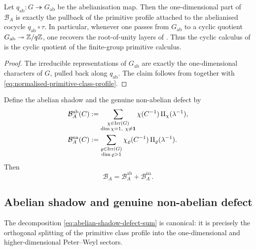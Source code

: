\begin{corollary}
  \label{cor:abelian-cyclic-shadow}
  Let \(q_{\mathrm{ab}}:G\twoheadrightarrow G_{\mathrm{ab}}\) be the
  abelianisation map. Then the one-dimensional part of
  \(\mathcal B_A\) is exactly the pullback of the primitive profile
  attached to the abelianised cocycle \(q_{\mathrm{ab}}\circ\tau\). In
  particular, whenever one passes from \(G_{\mathrm{ab}}\) to a cyclic
  quotient \(G_{\mathrm{ab}}\twoheadrightarrow \mathbb{Z}/q\mathbb{Z}\), one recovers
  the root-of-unity layers of . Thus the cyclic
  calculus of  is the cyclic quotient of the
  finite-group primitive calculus.
\end{corollary}

\begin{proof}
  The irreducible representations of \(G_{\mathrm{ab}}\) are exactly
  the one-dimensional characters of \(G\), pulled back along
  \(q_{\mathrm{ab}}\). The claim follows from
   together with
  \eqref{eq:normalised-primitive-class-profile}.
\end{proof}

Define the abelian shadow and the genuine non-abelian defect by
\begin{equation}\label{eq:abelian-shadow-defect}
  \begin{aligned}
    \mathcal B_A^{\mathrm{ab}}(C)
    &:=
    \sum_{\substack{\chi\in\operatorname{Irr}(G)\\ \dim\chi=1,\ \chi\neq \mathbf 1}}
      \chi(C^{-1})\,\Pi_\chi(\lambda^{-1}), \\
    \mathcal B_A^{\mathrm{na}}(C)
    &:=
    \sum_{\substack{\varrho\in\operatorname{Irr}(G)\\ \dim\varrho>1}}
      \chi_\varrho(C^{-1})\,\Pi_\varrho(\lambda^{-1}).
  \end{aligned}
\end{equation}
Then
\begin{equation}\label{eq:abelian-shadow-defect-sum}
  \mathcal B_A=\mathcal B_A^{\mathrm{ab}}+\mathcal B_A^{\mathrm{na}}.
\end{equation}

\subsection{Abelian shadow and genuine non-abelian defect}

The decomposition
\eqref{eq:abelian-shadow-defect-sum} is canonical: it is precisely the
orthogonal splitting of the primitive class profile into the
one-dimensional and higher-dimensional Peter--Weyl sectors.

